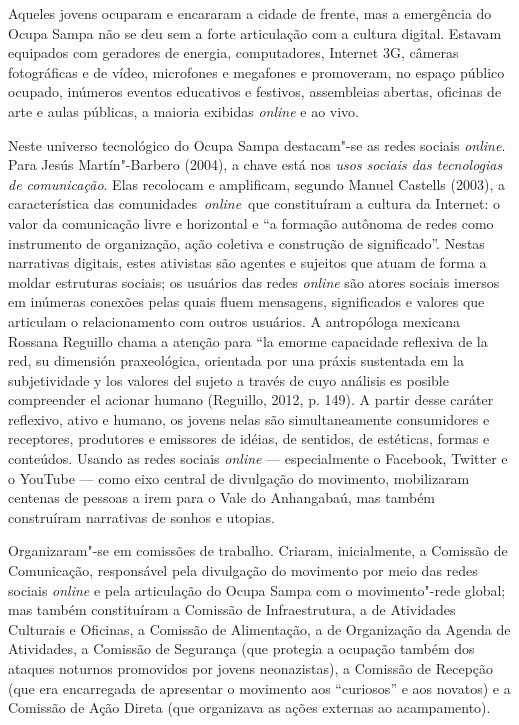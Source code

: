 Aqueles jovens ocuparam e encararam a cidade de frente, mas a
emergência do Ocupa Sampa não se deu sem a forte articulação com a
cultura digital. Estavam equipados com geradores de energia,
computadores, Internet 3G, câmeras fotográficas e de vídeo, microfones e
megafones e promoveram, no espaço público ocupado, inúmeros eventos
educativos e festivos, assembleias abertas, oficinas de arte e aulas
públicas, a maioria exibidas \emph{online} e ao vivo.

Neste universo tecnológico do Ocupa Sampa destacam"-se as redes sociais
\emph{online}. Para Jesús Martín"-Barbero (2004), a chave está nos \emph{usos
sociais das tecnologias de comunicação}. Elas recolocam e amplificam,
segundo Manuel Castells (2003), a característica das
comunidades~\emph{online}~que constituíram a cultura da Internet: o
valor da comunicação livre e horizontal e ``a formação autônoma de redes
como instrumento de organização, ação coletiva e construção de
significado''. Nestas narrativas digitais, estes ativistas são
agentes e sujeitos que atuam de forma a moldar estruturas sociais; os
usuários das redes \emph{online} são atores sociais imersos em
inúmeras conexões pelas quais fluem mensagens, significados e valores
que articulam o relacionamento com outros usuários. A antropóloga
mexicana Rossana Reguillo chama a atenção para ``la emorme capacidade
reflexiva de la red, su dimensión praxeológica, orientada por una práxis
sustentada em la subjetividade y los valores del sujeto a través de cuyo
análisis es posible compreender el acionar humano (Reguillo, 2012, p.
149). A partir desse caráter reflexivo, ativo e humano, os jovens
nelas  são simultaneamente consumidores e receptores, produtores e
emissores de idéias, de sentidos, de estéticas, formas e conteúdos.
Usando as redes sociais \emph{online} --- especialmente o Facebook, Twitter e o
YouTube --- como eixo central de divulgação do movimento, mobilizaram
centenas de pessoas a irem para o Vale do Anhangabaú, mas também
construíram narrativas de sonhos e utopias.

Organizaram"-se em comissões de trabalho. Criaram, inicialmente, a
Comissão de Comunicação, responsável pela divulgação do movimento por
meio das redes sociais \emph{online} e pela articulação do Ocupa Sampa
com o movimento"-rede global; mas também constituíram a Comissão de
Infraestrutura, a de Atividades Culturais e Oficinas, a Comissão de
Alimentação, a de Organização da Agenda de Atividades, a Comissão de
Segurança (que protegia a ocupação também dos ataques noturnos
promovidos por jovens neonazistas), a Comissão de Recepção (que era
encarregada de apresentar o movimento aos ``curiosos'' e aos novatos) e
a Comissão de Ação Direta (que organizava as ações externas ao
acampamento).

